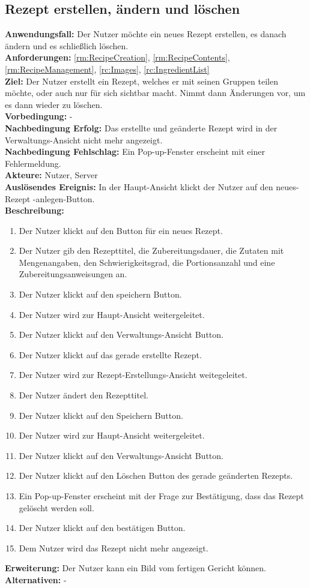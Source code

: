 \documentclass[parskip=full]{scrartcl}
\begin{document}
\subsection{Rezept erstellen, ändern und löschen}
\textbf{Anwendungsfall:} Der Nutzer möchte ein neues Rezept erstellen, es danach ändern und es schließlich löschen.\\
\textbf{Anforderungen:} \ref{rm:RecipeCreation}, \ref{rm:RecipeContents}, \ref{rm:RecipeManagement}, \ref{rc:Images}, \ref{rc:IngredientList}\\
\textbf{Ziel:} Der Nutzer erstellt ein Rezept, welches er mit seinen Gruppen teilen möchte, oder auch nur für sich sichtbar macht. Nimmt dann Änderungen vor, um es dann wieder zu löschen.\\
\textbf{Vorbedingung:} -\\
\textbf{Nachbedingung Erfolg:} Das erstellte und geänderte Rezept wird in der Verwaltungs-Ansicht nicht mehr angezeigt.  \\
\textbf{Nachbedingung Fehlschlag:} Ein Pop-up-Fenster erscheint mit einer Fehlermeldung.\\
\textbf{Akteure:} Nutzer, Server\\
\textbf{Auslösendes Ereignis:} In der Haupt-Ansicht klickt der Nutzer auf den neues-Rezept -anlegen-Button.\\
\textbf{Beschreibung:}
\begin{enumerate}
    \item Der Nutzer klickt auf den Button für ein neues Rezept.
    \item Der Nutzer gib den Rezepttitel, die Zubereitungsdauer, die Zutaten mit Mengenangaben, den Schwierigkeitsgrad, die Portionsanzahl und eine Zubereitungsanweisungen an.
    \item Der Nutzer klickt auf den speichern Button.
    \item Der Nutzer wird zur Haupt-Ansicht weitergeleitet.
    \item Der Nutzer klickt auf den Verwaltungs-Ansicht Button.
    \item Der Nutzer klickt auf das gerade erstellte Rezept.
    \item Der Nutzer wird zur Rezept-Erstellungs-Ansicht weitegeleitet.
    \item Der Nutzer ändert den Rezepttitel.
    \item Der Nutzer klickt auf den Speichern Button.
    \item Der Nutzer wird zur Haupt-Ansicht weitergeleitet.
    \item Der Nutzer klickt auf den Verwaltungs-Ansicht Button.
    \item Der Nutzer klickt auf den Löschen Button des gerade geänderten Rezepts.
    \item Ein Pop-up-Fenster erscheint mit der Frage zur Bestätigung, dass das Rezept gelöscht werden soll.
    \item Der Nutzer klickt auf den bestätigen Button.
    \item Dem Nutzer wird das Rezept nicht mehr angezeigt.
\end{enumerate}
\textbf{Erweiterung:} Der Nutzer kann ein Bild vom fertigen Gericht können.\\
\textbf{Alternativen:} -
\newpage
\end{document}

